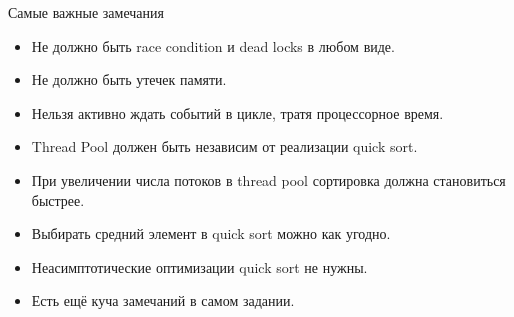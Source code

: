 \begin{frame}{Самые важные замечания}
	\begin{itemize}
		\item Не должно быть race condition и dead locks в любом виде.
		\item Не должно быть утечек памяти.
		\item Нельзя активно ждать событий в цикле, тратя процессорное время.
		\item Thread Pool должен быть независим от реализации quick sort.
		\item При увеличении числа потоков в thread pool сортировка должна становиться быстрее.
		\item Выбирать средний элемент в quick sort можно как угодно.
		\item Неасимптотические оптимизации quick sort не нужны.
		\item Есть ещё куча замечаний в самом задании.
	\end{itemize}
\end{frame}
